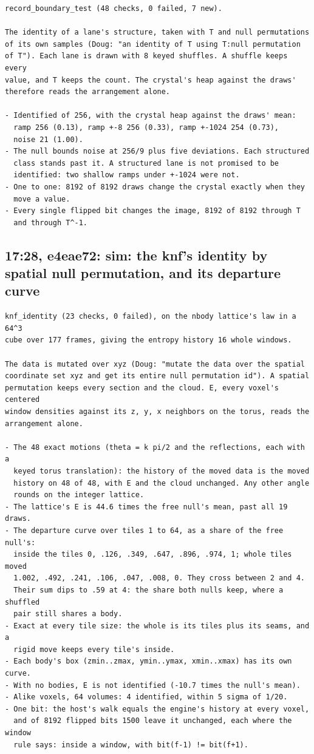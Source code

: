 \begin{Verbatim}
record_boundary_test (48 checks, 0 failed, 7 new).

The identity of a lane's structure, taken with T and null permutations
of its own samples (Doug: "an identity of T using T:null permutation
of T"). Each lane is drawn with 8 keyed shuffles. A shuffle keeps every
value, and T keeps the count. The crystal's heap against the draws'
therefore reads the arrangement alone.

- Identified of 256, with the crystal heap against the draws' mean:
  ramp 256 (0.13), ramp +-8 256 (0.33), ramp +-1024 254 (0.73),
  noise 21 (1.00).
- The null bounds noise at 256/9 plus five deviations. Each structured
  class stands past it. A structured lane is not promised to be
  identified: two shallow ramps under +-1024 were not.
- One to one: 8192 of 8192 draws change the crystal exactly when they
  move a value.
- Every single flipped bit changes the image, 8192 of 8192 through T
  and through T^-1.
\end{Verbatim}

\subsection{\texorpdfstring{17:28, e4eae72: sim: the knf's identity by spatial null permutation, and its departure curve}{17:28, e4eae72: sim: the knf's identity by spatial null permutation, and its departure curve}}

\begin{Verbatim}
knf_identity (23 checks, 0 failed), on the nbody lattice's law in a 64^3
cube over 177 frames, giving the entropy history 16 whole windows.

The data is mutated over xyz (Doug: "mutate the data over the spatial
coordinate set xyz and get its entire null permutation id"). A spatial
permutation keeps every section and the cloud. E, every voxel's centered
window densities against its z, y, x neighbors on the torus, reads the
arrangement alone.

- The 48 exact motions (theta = k pi/2 and the reflections, each with a
  keyed torus translation): the history of the moved data is the moved
  history on 48 of 48, with E and the cloud unchanged. Any other angle
  rounds on the integer lattice.
- The lattice's E is 44.6 times the free null's mean, past all 19 draws.
- The departure curve over tiles 1 to 64, as a share of the free null's:
  inside the tiles 0, .126, .349, .647, .896, .974, 1; whole tiles moved
  1.002, .492, .241, .106, .047, .008, 0. They cross between 2 and 4.
  Their sum dips to .59 at 4: the share both nulls keep, where a shuffled
  pair still shares a body.
- Exact at every tile size: the whole is its tiles plus its seams, and a
  rigid move keeps every tile's inside.
- Each body's box (zmin..zmax, ymin..ymax, xmin..xmax) has its own curve.
- With no bodies, E is not identified (-10.7 times the null's mean).
- Alike voxels, 64 volumes: 4 identified, within 5 sigma of 1/20.
- One bit: the host's walk equals the engine's history at every voxel,
  and of 8192 flipped bits 1500 leave it unchanged, each where the window
  rule says: inside a window, with bit(f-1) != bit(f+1).
\end{Verbatim}


